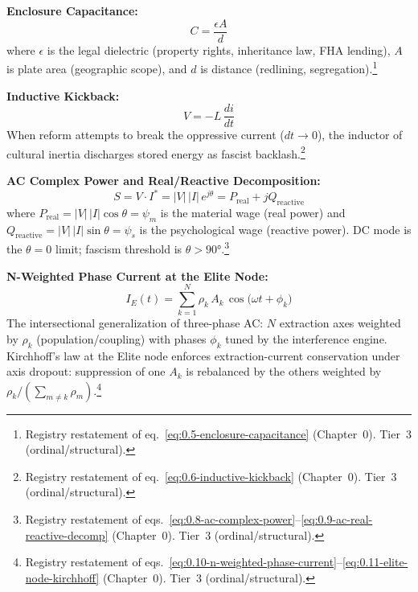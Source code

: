 \begin{definition}
\textbf{Enclosure Capacitance:}
\begin{equation}\label{eq:19.9-enclosure-capacitance-registry}
C = \frac{\epsilon A}{d}
\end{equation}
where $\epsilon$ is the legal dielectric (property rights, inheritance law,
FHA lending), $A$ is plate area (geographic scope), and $d$ is distance
(redlining, segregation).\footnote{Registry restatement of eq.~\eqref{eq:0.5-enclosure-capacitance} (Chapter~0). Tier~3 (ordinal/structural).}

\textbf{Inductive Kickback:}
\begin{equation}\label{eq:19.10-inductive-kickback-registry}
V = -L\,\frac{di}{dt}
\end{equation}
When reform attempts to break the oppressive current ($dt \to 0$), the
inductor of cultural inertia discharges stored energy as fascist backlash.\footnote{Registry restatement of eq.~\eqref{eq:0.6-inductive-kickback} (Chapter~0). Tier~3 (ordinal/structural).}

\textbf{AC Complex Power and Real/Reactive Decomposition:}
\begin{equation}\label{eq:19.11-ac-complex-power-registry}
S = V \cdot I^{*} = |V|\,|I|\,e^{j\theta} = P_{\text{real}} + jQ_{\text{reactive}}
\end{equation}
where $P_{\text{real}} = |V|\,|I|\cos\theta = \psi_m$ is the material
wage (real power) and $Q_{\text{reactive}} = |V|\,|I|\sin\theta = \psi_s$
is the psychological wage (reactive power). DC mode is the
$\theta = 0$ limit; fascism threshold is $\theta > 90°$.\footnote{Registry restatement of eqs.~\eqref{eq:0.8-ac-complex-power}--\eqref{eq:0.9-ac-real-reactive-decomp} (Chapter~0). Tier~3 (ordinal/structural).}

\textbf{N-Weighted Phase Current at the Elite Node:}
\begin{equation}\label{eq:19.12-n-weighted-phase-registry}
I_E(t) = \sum_{k=1}^{N} \rho_k\,A_k\,\cos\!\bigl(\omega t + \phi_k\bigr)
\end{equation}
The intersectional generalization of three-phase AC: $N$ extraction
axes weighted by $\rho_k$ (population/coupling) with phases $\phi_k$
tuned by the interference engine. Kirchhoff's law at the Elite node
enforces extraction-current conservation under axis dropout: suppression
of one $A_k$ is rebalanced by the others weighted by
$\rho_k / (\sum_{m \ne k} \rho_m)$.\footnote{Registry restatement of eqs.~\eqref{eq:0.10-n-weighted-phase-current}--\eqref{eq:0.11-elite-node-kirchhoff} (Chapter~0). Tier~3 (ordinal/structural).}


\end{definition}
